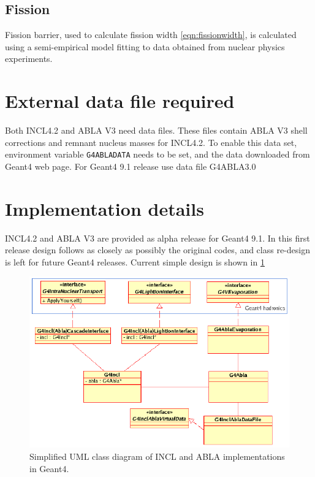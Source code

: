 
\subsection{Fission}

Fission barrier, used to calculate fission width
\ref{eqn:fissionwidth}, is calculated using a semi-empirical model
fitting to data obtained from nuclear physics experiments.


\section{External data file required}

Both INCL4.2 and ABLA V3 need data files. These files contain ABLA V3 shell corrections and remnant nucleus masses for INCL4.2. 
To enable this data set, environment variable {\tt G4ABLADATA} needs to be set, 
and the data downloaded from Geant4 web page. For Geant4 9.1 release use data file G4ABLA3.0

\section{Implementation details}
INCL4.2 and ABLA V3 are provided as alpha release for Geant4 9.1.
In this first release design follows as closely as possibly the original codes,
and class re-design is left for future Geant4 releases.
Current simple design is shown in  \ref{fig:uml}

\begin{figure}
\begin{center}
\includegraphics[angle=0,scale=1.0]{InclAblaUml.eps}
\end{center}
\caption[INCL4 and ABLA class diagram]{Simplified UML class diagram of
  INCL and ABLA implementations in Geant4.}
\label{fig:uml}
\end{figure}

